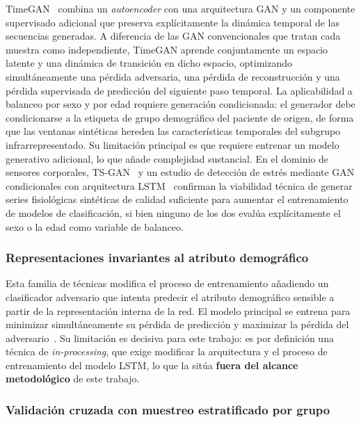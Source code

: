 TimeGAN~\cite{yoon2019timegan} combina un \emph{autoencoder} con una arquitectura GAN y un componente supervisado adicional que preserva explícitamente la dinámica temporal de las secuencias generadas. A diferencia de las GAN convencionales que tratan cada muestra como independiente, TimeGAN aprende conjuntamente un espacio latente y una dinámica de transición en dicho espacio, optimizando simultáneamente una pérdida adversaria, una pérdida de reconstrucción y una pérdida supervisada de predicción del siguiente paso temporal. La aplicabilidad a balanceo por sexo y por edad requiere generación condicionada: el generador debe condicionarse a la etiqueta de grupo demográfico del paciente de origen, de forma que las ventanas sintéticas hereden las características temporales del subgrupo infrarrepresentado. Su limitación principal es que requiere entrenar un modelo generativo adicional, lo que añade complejidad sustancial. En el dominio de sensores corporales, TS-GAN~\cite{dong2023tsgan} y un estudio de detección de estrés mediante GAN condicionales con arquitectura LSTM~\cite{dahmen2022conditionalgan} confirman la viabilidad técnica de generar series fisiológicas sintéticas de calidad suficiente para aumentar el entrenamiento de modelos de clasificación, si bien ninguno de los dos evalúa explícitamente el sexo o la edad como variable de balanceo.

\subsubsection{Representaciones invariantes al atributo demográfico}
\label{subsec:adversarial_debiasing}

Esta familia de técnicas modifica el proceso de entrenamiento añadiendo un clasificador adversario que intenta predecir el atributo demográfico sensible a partir de la representación interna de la red. El modelo principal se entrena para minimizar simultáneamente su pérdida de predicción y maximizar la pérdida del adversario~\cite{louizos2016variational,edwards2016censoring,zemel2013fairrepr}. Su limitación es decisiva para este trabajo: es por definición una técnica de \emph{in-processing}, que exige modificar la arquitectura y el proceso de entrenamiento del modelo LSTM, lo que la sitúa \textbf{fuera del alcance metodológico} de este trabajo.

\subsubsection{Validación cruzada con muestreo estratificado por grupo}
\label{subsec:stratified_cv_demografico}

